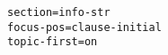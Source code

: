 \documentclass[a4paper]{article}
\begin{document}
{\small\begin{verbatim}
section=info-str
focus-pos=clause-initial
topic-first=on
\end{verbatim}}
\end{document}
